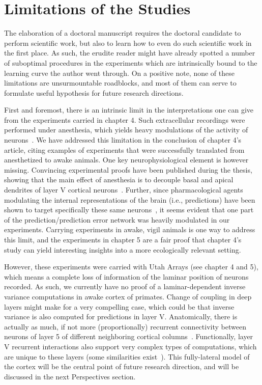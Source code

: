 \section{Limitations of the Studies}
The elaboration of a doctoral manuscript requires the doctoral candidate to perform scientific work, but also to learn how to even do such scientific work in the first place. As such, the erudite reader might have already spotted a number of suboptimal procedures in the experiments which are intrinsically bound to the learning curve the author went through. On a positive note, none of these limitations are unsurmountable roadblocks, and most of them can serve to formulate useful hypothesis for future research directions.

First and foremost, there is an intrinsic limit in the interpretations one can give from the experiments carried in chapter 4. Such extracellular recordings were performed under anesthesia, which yields heavy modulations of the activity of neurons~\cite{villeneuve2003use}. We have addressed this limitation in the conclusion of chapter 4's article, citing examples of experiments that were successfully translated from anesthetized to awake animals. One key neurophysiological element is however missing. Convincing experimental proofs have been published during the thesis, showing that the main effect of anesthesia is to decouple basal and apical dendrites of layer V cortical neurons~\cite{suzuki2020general}. Further, since pharmacological agents modulating the internal representations of the brain (i.e., predictions) have been shown to target specifically these same neurons~\cite{heindorf2022reduction}, it seems evident that one part of the prediction/prediction error network was heavily modulated in our experiments. Carrying experiments in awake, vigil animals is one way to address this limit, and the experiments in chapter 5 are a fair proof that chapter 4's study can yield interesting insights into a more ecologically relevant setting.

However, these experiments were carried with Utah Arrays (see chapter 4 and 5), which means a complete loss of information of the laminar position of neurons recorded. As such, we currently have no proof of a laminar-dependent inverse variance computations in awake cortex of primates. Change of coupling in deep layers might make for a very compelling case, which could be that inverse variance is also computed for predictions in layer V. Anatomically, there is actually as much, if not more (proportionally) recurrent connectivity between neurons of layer 5 of different neighboring cortical columns~\cite{briggs2011corticogeniculate, bastos2012canonical}. Functionally, layer V recurrent interactions also support very complex types of computations\cite{velez2014stimulus}, which are unique to these layers (some similarities exist~\cite{galloni2020apical}). This fully-lateral model of the cortex will be the central point of future research direction, and will be discussed in the next Perspectives section. 


